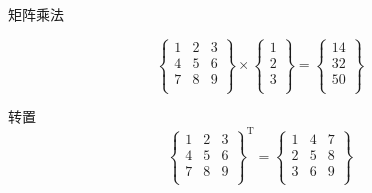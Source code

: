 \documentclass[UTF8,16pt]{ctexart}
\begin{document}
矩阵乘法

{\color{white} 
$$
\left\{
 \begin{matrix}
   1 & 2 & 3\\
   4 & 5 & 6\\
   7 & 8 & 9\\
  \end{matrix}
  \right\} \times 
\left\{
 \begin{matrix}
   1\\
   2\\
   3\\
  \end{matrix}
  \right\}=\left\{
 \begin{matrix}
   14\\
   32\\
   50\\
  \end{matrix}
  \right\}
$$
 }

转置
{\color{white} 
$$
\left\{
 \begin{matrix}
   1 & 2 & 3\\
   4 & 5 & 6\\
   7 & 8 & 9\\
  \end{matrix}
  \right\}^\mathrm{T} =\left\{
 \begin{matrix}
    1 & 4 & 7\\
   2 & 5 & 8\\
   3 & 6 & 9\\
  \end{matrix}
  \right\}
$$
 }
\end{document}

